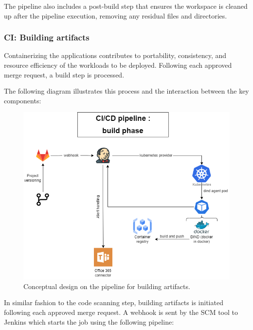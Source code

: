 \hspace{7mm}The pipeline also includes a post-build step that ensures the workspace is cleaned up after the pipeline execution, removing any residual files and directories.
 

\subsubsection{CI: Building artifacts}

\hspace{7mm}Containerizing the applications contributes to portability, consistency, and resource efficiency of the workloads to be deployed. Following each approved merge request, a build step is processed. 

\hspace{7mm}The following diagram illustrates this process and the interaction between the key components: 

\begin{figure}[H]\centering
\includegraphics[width=1.0\textwidth,angle=00]{assets/f49.png}
\caption{Conceptual design on the pipeline for building artifacts.}
\label{fig:Conceptual design of building artifact }
\end{figure}

\hspace{7mm}In similar fashion to the code scanning step, building artifacts is initiated following each approved merge request. A webhook is sent by the SCM tool to Jenkins which starts the job using the following pipeline: 

